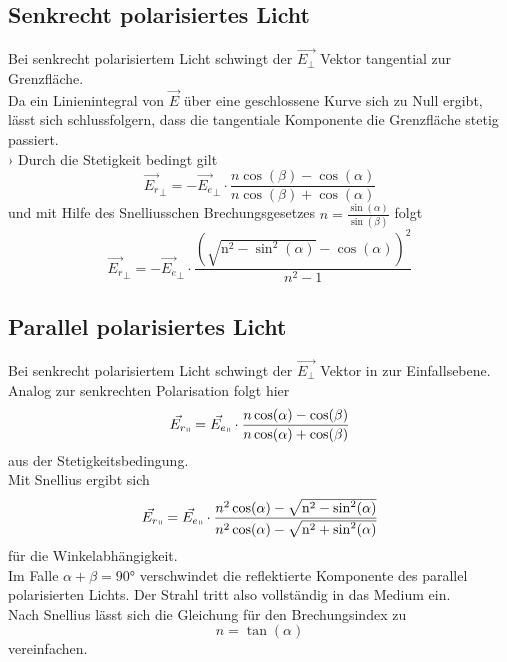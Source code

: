 \subsection{Senkrecht polarisiertes Licht}
Bei senkrecht polarisiertem Licht schwingt der $\vec{E_\bot}$ Vektor tangential zur Grenzfläche.\\
Da ein Linienintegral von $\vec{E}$ über eine geschlossene Kurve sich zu Null ergibt, lässt sich schlussfolgern, dass 
die tangentiale Komponente die Grenzfläche stetig passiert.\\›
Durch die Stetigkeit bedingt gilt
\begin{equation*}
    \vec{E_r}_\bot = -\vec{E_e}_\bot \cdot \frac{n \cos(\beta)-\cos(\alpha)}{n \cos(\beta)+\cos(\alpha)}
\end{equation*}
und mit Hilfe des Snelliusschen Brechungsgesetzes $n = \frac{\sin(\alpha)}{\sin(\beta)}$ folgt 
\begin{equation}
    \vec{E_r}_\bot = -\vec{E_e}_\bot \cdot \frac{(\sqrt{\mathrm{n^2} - \sin^2(\alpha)} - \cos(\alpha))^2}{n^2 - 1}
    \label{eq:1}
\end{equation}

 \subsection{Parallel polarisiertes Licht}
Bei senkrecht polarisiertem Licht schwingt der $\vec{E_\bot}$ Vektor in zur Einfallsebene.\\
Analog zur senkrechten Polarisation folgt hier
\begin{equation*}
    \vec{E_r}_\shortparallel  = \vec{E_e}_\shortparallel  \cdot \frac{n \cos(\alpha)-\cos(\beta)}{n \cos(\alpha)+\cos(\beta)}
\end{equation*}
aus der Stetigkeitsbedingung.\\
Mit Snellius ergibt sich  
\begin{equation}
    \vec{E_r}_\shortparallel  = \vec{E_e}_\shortparallel  \cdot \frac{n^2 \cos(\alpha) - \sqrt{\mathrm{n^2} - \sin^2(\alpha)}}{n^2 \cos(\alpha) - \sqrt{\mathrm{n^2} + \sin^2(\alpha)}}
    \label{eq:2}
\end{equation}
für die Winkelabhängigkeit.\\
Im Falle $\alpha + \beta = 90°$ verschwindet die reflektierte Komponente des parallel polarisierten Lichts. Der Strahl tritt also
vollständig in das Medium ein.\\
Nach Snellius lässt sich die Gleichung für den Brechungsindex zu 
\begin{equation}
    n = \tan(\alpha)
    \label{eq:3}
\end{equation}
vereinfachen. \\

